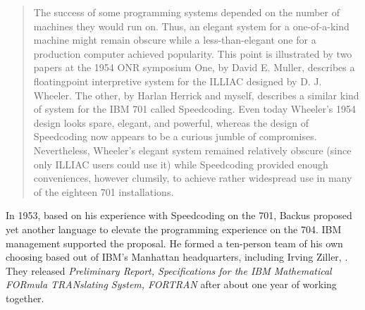 \begin{quotation}
    The success of some programming systems depended on the number of machines 
they would run on. Thus, an elegant system for a one-of-a-kind machine might 
remain obscure while a less-than-elegant one for a production computer achieved 
popularity. This point is illustrated by two papers at the 1954 ONR symposium 
One, by David E. Muller, describes a floatingpoint interpretive system for 
the ILLIAC designed by D. J. Wheeler. The other, by Harlan Herrick and myself, 
describes a similar kind of system for the IBM 701 called Speedcoding. Even 
today Wheeler's 1954 design looks spare, elegant, and powerful, whereas the 
design of Speedcoding now appears to be a curious jumble of compromises. 
Nevertheless, Wheeler's elegant system remained relatively obscure (since only 
ILLIAC users could use it) while Speedcoding provided enough conveniences, 
however clumsily, to achieve rather widespread use in many of the eighteen 701 
installations. 
\end{quotation}

In 1953, based on his experience with Speedcoding on the 701, Backus proposed yet another language to elevate the programming experience on the 704.
IBM management supported the proposal.
He formed a ten-person team of his own choosing based out of IBM's Manhattan headquarters,
including Irving Ziller, .
They released \textit{Preliminary Report, Specifications for the IBM Mathematical FORmula TRANslating System, FORTRAN}\cite{IBM_1954_FORTRAN_Specifications}
after about one year of working together.


